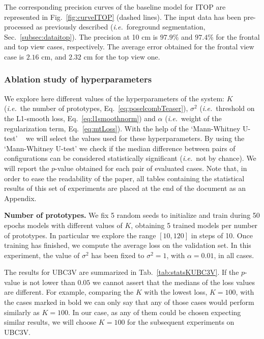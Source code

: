 \documentclass[review,12pt,3p]{elsarticle}
\def \ie{\textit{i.e.}}
\newcommand{\myparagraph}[1]{\noindent \textbf{#1}}
\begin{document}
The corresponding precision curves of the baseline model for ITOP are represented in Fig.~\ref{fig:curveITOP} (dashed lines). The input data has been pre-processed as previously described (\ie~foreground segmentation, Sec.~\ref{subsec:dataitop}). 
The precision at 10 cm is $97.9$\% and $97.4$\% for the frontal and top view cases, respectively.
The average error obtained for the frontal view case is $2.16$ cm, and $2.32$ cm for the top view one. 
%

\subsubsection{Ablation study of hyperparameters}
%
We explore here different values of the hyperparameters of the system: $K$ (\ie~the number of prototypes, Eq.~\ref{eq:poselcombTeaser}), $\sigma^2$ (\ie~threshold on the L1-smooth loss, Eq.~\ref{eq:l1smoothnorm}) and $\alpha$ (\ie~weight of the regularization term, Eq.~\ref{eq:mtLoss}).
With the help of the `Mann-Whitney U-test' ~\cite{MannWhitney1947test} we will select the values used for these hyperparameters.
By using the `Mann-Whitney U-test' we check if the median difference between pairs of configurations can be considered statistically significant (\ie~not by chance). We will report the $p$-value obtained for each pair of evaluated cases.
%
Note that, in order to ease the readability of the paper, all tables containing the statistical results of this set of experiments are placed at the end of the document as an Appendix.

\myparagraph{Number of prototypes.}
We fix 5 random seeds to initialize and train during 50 epochs models with different values of $K$, obtaining 5 trained models per number of prototypes.
In particular we explore the range $\left[10,120\right]$ in steps of 10.
Once training has finished, we compute the average loss on the validation set. 
In this experiment, the value of $\sigma^2$ has been fixed to $\sigma^2=1$, with $\alpha=0.01$, in all cases.


The results for UBC3V are summarized in Tab.~\ref{tab:statsKUBC3V}. If the $p$-value is not lower than $0.05$ we cannot assert that the medians of the loss values are different. For example, comparing the $K$ with the lowest loss, $K=100$, with the cases marked in bold we can only say that any of those cases would perform similarly as $K=100$. In our case, as any of them could be chosen expecting similar results, we will choose $K=100$ for the subsequent experiments on UBC3V.
\end{document}
